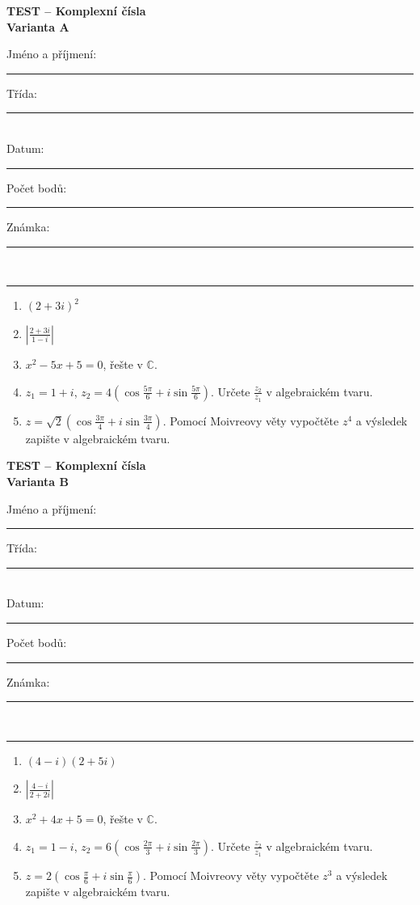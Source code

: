 \documentclass[a4paper,11pt]{article}
\newcommand{\TestTitle}{Komplexní čísla}
\newcommand{\TestHeader}[1]{%
    \begin{center}
        {\Large\bfseries TEST -- \TestTitle}\\[2mm]
        {\bfseries Varianta #1}
    \end{center}
    \vspace{2mm}
    Jméno a příjmení: \rule{9cm}{0.4pt}\hfill Třída: \rule{2cm}{0.4pt}\\[3mm]
    Datum: \rule{3cm}{0.4pt}\hfill Počet bodů: \rule{2cm}{0.4pt}\hfill Známka: \rule{2cm}{0.4pt}\\[2mm]
    \hrule\vspace{4mm}
}
\newcommand{\AnswerSpace}[1]{\vspace{#1}}
\begin{document}
\TestHeader{A}

\begin{enumerate}
    \item \((2+3i)^2\)
    \AnswerSpace{17mm}
    \item \(\left|\frac{2+3i}{1-i}\right|\)
    \AnswerSpace{24mm}
    \item \(x^2-5x+5=0\), řešte v \(\mathbb C\).
    \AnswerSpace{28mm}
    \item \(z_1=1+i\), \(z_2=4\left(\cos\frac{5\pi}{6}+i\sin\frac{5\pi}{6}\right)\). Určete \(\frac{z_2}{z_1}\) v algebraickém tvaru.
    \AnswerSpace{35mm}
    \item \(z=\sqrt2\left(\cos\frac{3\pi}{4}+i\sin\frac{3\pi}{4}\right)\). Pomocí Moivreovy věty vypočtěte \(z^4\) a výsledek zapište v algebraickém tvaru.
    \AnswerSpace{30mm}
\end{enumerate}

\newpage
\TestHeader{B}

\begin{enumerate}
    \item \((4-i)(2+5i)\)
    \AnswerSpace{17mm}
    \item \(\left|\frac{4-i}{2+2i}\right|\)
    \AnswerSpace{24mm}
    \item \(x^2+4x+5=0\), řešte v \(\mathbb C\).
    \AnswerSpace{28mm}
    \item \(z_1=1-i\), \(z_2=6\left(\cos\frac{2\pi}{3}+i\sin\frac{2\pi}{3}\right)\). Určete \(\frac{z_2}{z_1}\) v algebraickém tvaru.
    \AnswerSpace{35mm}
    \item \(z=2\left(\cos\frac{\pi}{6}+i\sin\frac{\pi}{6}\right)\). Pomocí Moivreovy věty vypočtěte \(z^3\) a výsledek zapište v algebraickém tvaru.
    \AnswerSpace{30mm}
\end{enumerate}
\end{document}
